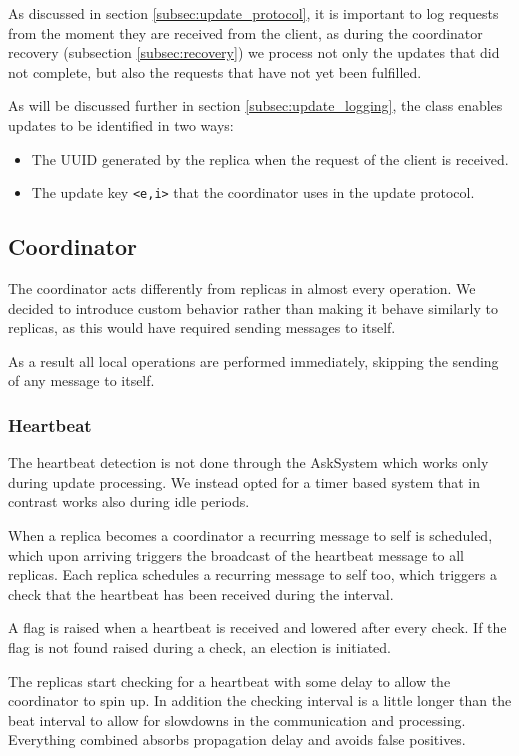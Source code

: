 \documentclass[a4paper]{article}
\begin{document}
                As discussed in section \ref{subsec:update_protocol}, it is important to log requests from the moment they are received from the client, as during the coordinator recovery (subsection \ref{subsec:recovery}) we process not only the updates that did not complete, but also the requests that have not yet been fulfilled.

                As will be discussed further in section \ref{subsec:update_logging}, the class enables updates to be identified in two ways:
                \begin{itemize}
                    \item The UUID generated by the replica when the request of the client is received.
                    \item The update key \texttt{<e,i>} that the coordinator uses in the update protocol.
                \end{itemize}
        \subsection{Coordinator}
            The coordinator acts differently from replicas in almost every operation. We decided to introduce custom behavior rather than making it behave similarly to replicas, as this would have required sending messages to itself.

            As a result all local operations are performed immediately, skipping the sending of any message to itself.
            \subsubsection{Heartbeat}
                The heartbeat detection is not done through the AskSystem which works only during update processing. We instead opted for a timer based system that in contrast works also during idle periods.

                When a replica becomes a coordinator a recurring message to self is scheduled, which upon arriving triggers the broadcast of the heartbeat message to all replicas. Each replica schedules a recurring message to self too, which triggers a check that the heartbeat has been received during the interval.
                
                A flag is raised when a heartbeat is received and lowered after every check. If the flag is not found raised during a check, an election is initiated.

                The replicas start checking for a heartbeat with some delay to allow the coordinator to spin up. In addition the checking interval is a little longer than the beat interval to allow for slowdowns in the communication and processing. Everything combined absorbs propagation delay and avoids false positives.
\end{document}
